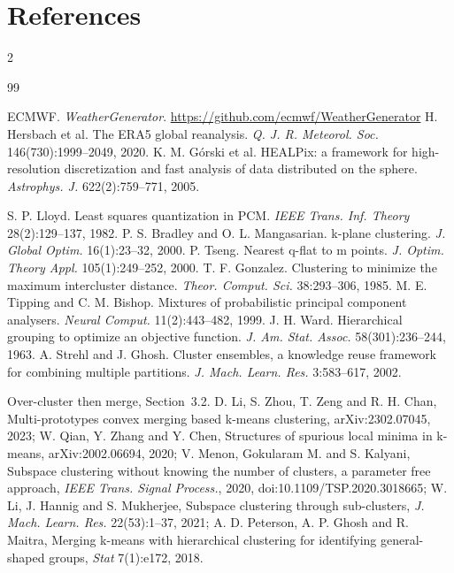 \documentclass[10pt,twocolumn]{article}
\begin{document}
\section*{References}
\vspace{-1.2\baselineskip}
\begin{multicols}{2}
\renewcommand{\refname}{}
\begin{thebibliography}{99}\scriptsize
\itemsep0pt

 ECMWF. \emph{WeatherGenerator}. \url{https://github.com/ecmwf/WeatherGenerator}
 H. Hersbach et al. The ERA5 global reanalysis. \emph{Q. J. R. Meteorol. Soc.} 146(730):1999--2049, 2020.
 K. M. G\'orski et al. HEALPix: a framework for high-resolution discretization and fast analysis of data distributed on the sphere. \emph{Astrophys. J.} 622(2):759--771, 2005.

 S. P. Lloyd. Least squares quantization in PCM. \emph{IEEE Trans. Inf. Theory} 28(2):129--137, 1982.
 P. S. Bradley and O. L. Mangasarian. k-plane clustering. \emph{J. Global Optim.} 16(1):23--32, 2000.
 P. Tseng. Nearest q-flat to m points. \emph{J. Optim. Theory Appl.} 105(1):249--252, 2000.
 T. F. Gonzalez. Clustering to minimize the maximum intercluster distance. \emph{Theor. Comput. Sci.} 38:293--306, 1985.
 M. E. Tipping and C. M. Bishop. Mixtures of probabilistic principal component analysers. \emph{Neural Comput.} 11(2):443--482, 1999.
 J. H. Ward. Hierarchical grouping to optimize an objective function. \emph{J. Am. Stat. Assoc.} 58(301):236--244, 1963.
 A. Strehl and J. Ghosh. Cluster ensembles, a knowledge reuse framework for combining multiple partitions. \emph{J. Mach. Learn. Res.} 3:583--617, 2002.

 Over-cluster then merge, Section~3.2. D. Li, S. Zhou, T. Zeng and R. H. Chan, Multi-prototypes convex merging based k-means clustering, arXiv:2302.07045, 2023;
W. Qian, Y. Zhang and Y. Chen, Structures of spurious local minima in k-means, arXiv:2002.06694, 2020;
V. Menon, Gokularam M. and S. Kalyani, Subspace clustering without knowing the number of clusters, a parameter free approach, \emph{IEEE Trans. Signal Process.}, 2020, doi:10.1109/TSP.2020.3018665;
W. Li, J. Hannig and S. Mukherjee, Subspace clustering through sub-clusters, \emph{J. Mach. Learn. Res.} 22(53):1--37, 2021;
A. D. Peterson, A. P. Ghosh and R. Maitra, Merging k-means with hierarchical clustering for identifying general-shaped groups, \emph{Stat} 7(1):e172, 2018.


\end{thebibliography}
\end{multicols}
\end{document}
